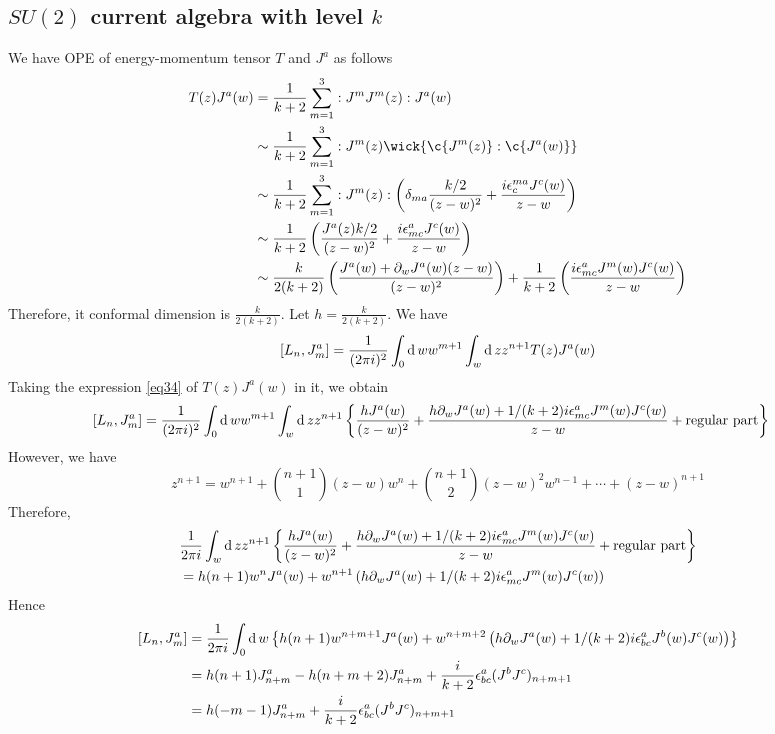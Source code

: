 \subsection{$SU(2)$ current algebra with level $k$}
We have OPE of energy-momentum tensor $T$ and $J^a$ as follows
\begin{equation}
\label{eq34}
	\begin{split}
	T(z) J^a(w) & = \frac{1}{k+2} \sum_{m=1}^3 : J^m J^m (z):J^a(w)\\
	& \sim \frac{1}{k+2} \sum_{m=1}^3 : J^m(z) \wick{\c{J^m(z)} : \c{J^a(w)} }\\
	& \sim \frac{1}{k+2} \sum_{m=1}^3 : J^m(z): \left(\delta_{ma}\frac{k/2 }{(z-w)^2} + \frac{i \epsilon^{ma}_c J^c(w)}{z-w} \right)\\
	& \sim \frac{1}{k+2} \left(\frac{J^a(z)k/2}{(z-w)^2} + \frac{i \epsilon^{a}_{mc} J^c(w) }{z-w} \right)\\
	& \sim \frac{k}{2(k+2)} \left(\frac{J^a(w) + \partial_wJ^a(w)(z-w) }{(z-w)^2} \right) + \frac{1}{k+2}\left( \frac{i \epsilon^{a}_{mc}J^m(w)J^c(w) }{z-w} \right)
	\end{split}
\end{equation}
Therefore, it conformal dimension is $\frac{k}{2(k+2)}$. Let $h= \frac{k}{2(k+2)}$. We have 
\[
[L_n, J^a_m] = \frac{1}{(2\pi i)^2} \int_0 \operatorname{d} w w^{m+1} \int_w \operatorname{d} z z^{n+1} T(z) J^a(w)
\]
Taking the expression \ref{eq34} of $T(z)J^a(w)$ in it, we obtain
\begin{equation}
	\begin{split}
	[L_n,J^a_m]&= \frac{1}{(2\pi i)^2} \int_0 \operatorname{d} w w^{m+1} \int_{w} \operatorname{d} z z^{n+1} \left\{\frac{h J^a(w)}{(z-w)^2} + \frac{h\partial_w J^a(w) + 1/(k+2) i \epsilon^a_{mc}J^m(w)J^c(w)}{z-w} + \text{regular part}\right\}
	\end{split}
\end{equation}
However, we have 
\begin{equation}
	z^{n+1} = w^{n+1} + \binom{n+1}{1}(z-w) w^n + \binom{n+1}{2}(z-w)^2 w^{n-1} + \cdots + (z-w)^{n+1}
\end{equation}
Therefore, 
\begin{equation}
	\begin{split}
	&\frac{1}{2\pi i}\int_{w} \operatorname{d} z z^{n+1} \left\{\frac{h J^a(w)}{(z-w)^2} + \frac{h\partial_w J^a(w) + 1/(k+2) i \epsilon^a_{mc}J^m(w)J^c(w)}{z-w} + \text{regular part}\right\}\\
	&= h(n+1) w^n J^a(w) + w^{n+1} \left(  h\partial_w J^a(w) + 1/(k+2) i \epsilon^a_{mc}J^m(w)J^c(w) \right)
	\end{split}
\end{equation}
Hence
\begin{equation}
	\begin{split}
	[L_n,J^a_m]&= \frac{1}{2\pi i}\int_0 \operatorname{d} w \left\{h(n+1) w^{n+m+1} J^a(w) + w^{n+m+2} \left(  h\partial_w J^a(w) + 1/(k+2) i \epsilon^a_{bc}J^b(w)J^c(w) \right) \right\}\\
	&= h(n+1) J^a_{n+m} -h(n+m+2) J^a_{n+m} + \frac{i}{k+2}\epsilon^a_{bc}(J^b J^c)_{n+m+1}\\
	& = h(-m-1)J^a_{n+m} + \frac{i}{k+2}\epsilon^a_{bc}(J^b J^c)_{n+m+1}
	\end{split}
\end{equation}
